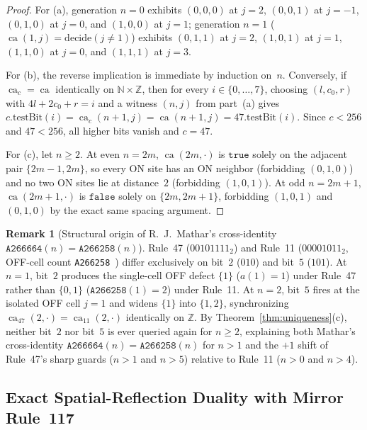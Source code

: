 \documentclass[11pt]{article}
\theoremstyle{definition}
\newtheorem{remark}[theorem]{Remark}
\newcommand{\N}{\mathbb{N}}
\newcommand{\Z}{\mathbb{Z}}
\newcommand{\seq}[1]{\texttt{#1}}
\newcommand{\ca}{\operatorname{ca}}
\begin{document}
\begin{proof}
For (a), generation $n = 0$ exhibits $(0,0,0)$ at $j = 2$, $(0,0,1)$ at $j = -1$, $(0,1,0)$ at $j = 0$, and $(1,0,0)$ at $j = 1$; generation $n = 1$ ($\ca(1, j) = \mathrm{decide}(j \ne 1)$) exhibits $(0,1,1)$ at $j = 2$, $(1,0,1)$ at $j = 1$, $(1,1,0)$ at $j = 0$, and $(1,1,1)$ at $j = 3$.

For (b), the reverse implication is immediate by induction on~$n$. Conversely, if $\ca_c = \ca$ identically on $\N \times \Z$, then for every $i \in \{0, \dots, 7\}$, choosing $(l, c_0, r)$ with $4l + 2c_0 + r = i$ and a witness $(n, j)$ from part~(a) gives $c.\mathrm{testBit}(i) = \ca_c(n + 1, j) = \ca(n + 1, j) = 47.\mathrm{testBit}(i)$. Since $c < 256$ and $47 < 256$, all higher bits vanish and $c = 47$.

For (c), let $n \ge 2$. At even $n = 2m$, $\ca(2m, \cdot)$ is $\mathtt{true}$ solely on the adjacent pair $\{2m - 1, 2m\}$, so every ON site has an ON neighbor (forbidding $(0,1,0)$) and no two ON sites lie at distance~$2$ (forbidding $(1,0,1)$). At odd $n = 2m + 1$, $\ca(2m + 1, \cdot)$ is $\mathtt{false}$ solely on $\{2m, 2m + 1\}$, forbidding $(1,0,1)$ and $(0,1,0)$ by the exact same spacing argument.
\end{proof}

\begin{remark}[Structural origin of R.~J.\ Mathar's cross-identity $\seq{A266664}(n) = \seq{A266258}(n)$]
Rule~47 ($00101111_2$) and Rule~11 ($00001011_2$, OFF-cell count \seq{A266258}~\cite{oeis266258}) differ exclusively on bit~$2$ ($010$) and bit~$5$ ($101$). At $n = 1$, bit~$2$ produces the single-cell OFF defect $\{1\}$ ($a(1) = 1$) under Rule~47 rather than $\{0, 1\}$ ($\seq{A266258}(1) = 2$) under Rule~11. At $n = 2$, bit~$5$ fires at the isolated OFF cell $j = 1$ and widens $\{1\}$ into $\{1, 2\}$, synchronizing $\ca_{47}(2, \cdot) = \ca_{11}(2, \cdot)$ identically on $\Z$. By Theorem~\ref{thm:uniqueness}(c), neither bit~$2$ nor bit~$5$ is ever queried again for $n \ge 2$, explaining both Mathar's cross-identity $\seq{A266664}(n) = \seq{A266258}(n)$ for $n > 1$ and the $+1$ shift of Rule~47's sharp guards ($n > 1$ and $n > 5$) relative to Rule~11 ($n > 0$ and $n > 4$).
\end{remark}

\subsection{Exact Spatial-Reflection Duality with Mirror Rule~117}
\end{document}
